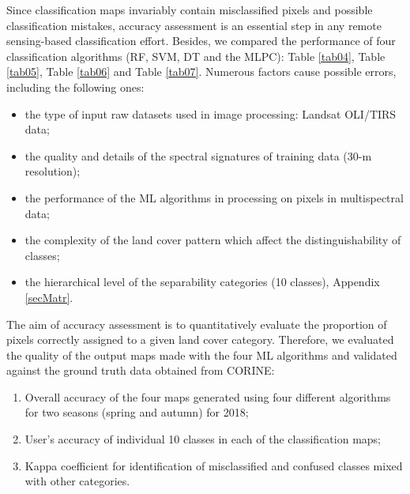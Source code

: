 \documentclass[jimaging,article,accept,pdftex,oneauthor]{Definitions/mdpi}
\begin{document}
Since classification maps invariably contain misclassified pixels and possible classification mistakes, accuracy assessment is an essential step in any remote sensing-based classification effort. Besides, we compared the performance of four classification algorithms (RF, SVM, DT and {the} MLPC): Table \ref{tab04}, Table \ref{tab05}, Table \ref{tab06} and Table \ref{tab07}. Numerous factors cause possible errors, including the following ones:
\begin{itemize} 
	\item the type of input raw datasets used in image processing: Landsat OLI/TIRS data;
	\item the quality and details of the spectral signatures of training data (30-m resolution);
	\item the performance of the ML algorithms in processing on pixels in multispectral data;
	\item the complexity of the land cover pattern which affect the distinguishability of classes;
	\item the hierarchical level of the separability categories (10 classes), Appendix \ref{secMatr}.
\end{itemize} 
	
The aim of accuracy assessment is to  {quantitatively evaluate the proportion of pixels correctly assigned to a given land cover category}. Therefore, we evaluated the quality of the {output maps made with the four ML algorithms and validated against the ground truth data obtained from CORINE}:
\begin{enumerate}
	\item Overall accuracy of the four maps generated using four different algorithms for two seasons (spring and autumn) {for 2018};
	\item User's accuracy of individual 10 classes in each of the classification maps;
	\item Kappa coefficient for identification of misclassified and confused classes mixed with other categories.
\end{enumerate}
\end{document}
